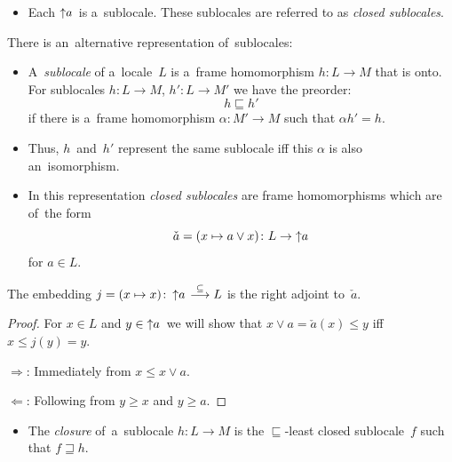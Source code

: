 \begin{itemize}
\item Each $\left\uparrow a\right.$ is a~sublocale.
These sublocales are referred to as \emph{closed sublocales\/}.
\end{itemize}

\begin{rem}
  There is an~alternative representation of~sublocales:
  \begin{itemize}
    \item A~\emph{sublocale\/} of a~locale~$L$ is a~frame homomorphism $h\colon
    L \to M$ that is onto.
    For sublocales $h\colon L \to M$, $h'\colon L \to M'$ we have the preorder:
    \[
      h \sqsubseteq h'
    \]
    if there is a~frame homomorphism $\alpha\colon M' \to M$ such that $\alpha
    h' = h$.

    \item Thus, $h$~and~$h'$ represent the same sublocale iff this $\alpha$ is
    also an~isomorphism.

    \item
    \label{df:closed-sloc}
    In this representation \emph{closed sublocales\/} are frame homomorphisms
    which are of~the form
    \[
      \check{a} = (x \mapsto a \vee x) \colon L \to \left\uparrow a \right.
    \]
    for $a\in L$.
  \end{itemize}
\end{rem}

\begin{lem} \label{lem:embed-adjoint}
  The embedding $j = (x \mapsto x)\colon \left\uparrow a \right. \embed L$ is
  the right adjoint to~$\check{a}$.
\end{lem}
\begin{proof}
  For $x\in L$ and $y\in \left\uparrow a \right.$ we will show that $x \vee a =
  \check{a}(x) \le y$ iff $x \le j(y) = y$.

  $\Rightarrow$:
  Immediately from $x \le x \vee a$.

  $\Leftarrow$:
  Following from $y \ge x$ and $y \ge a$.
\end{proof}

\begin{itemize}
  \item The \emph{closure\/} of~a~sublocale $h\colon L \to M$ is the
  $\sqsubseteq$-least closed sublocale~$f$ such that $f \sqsupseteq h$.
\end{itemize}

